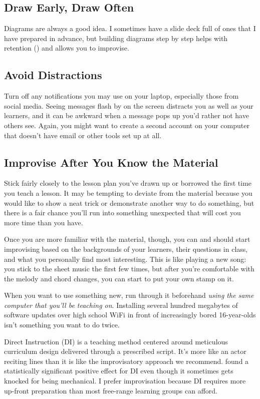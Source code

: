 \subsection*{Draw Early, Draw Often}

Diagrams are always a good idea.
I sometimes have a slide deck full of ones that I have prepared in advance,
but building diagrams step by step helps with retention ()
and allows you to improvise.

\subsection*{Avoid Distractions}

Turn off any notifications you may use on your laptop,
especially those from social media.
Seeing messages flash by on the screen distracts you as well as your learners,
and it can be awkward when a message pops up you'd rather not have others see.
Again,
you might want to create a second account on your computer
that doesn't have email or other tools set up at all.

\subsection*{Improvise After You Know the Material}

Stick fairly closely to the lesson plan you've drawn up or borrowed
the first time you teach a lesson.
It may be tempting to deviate from the material
because you would like to show a neat trick or demonstrate another way to do something,
but there is a fair chance you'll run into something unexpected
that will cost you more time than you have.

Once you are more familiar with the material,
though,
you can and should start improvising based on the backgrounds of your learners,
their questions in class,
and what you personally find most interesting.
This is like playing a new song:
you stick to the sheet music the first few times,
but after you're comfortable with the melody and chord changes,
you can start to put your own stamp on it.

When you want to use something new,
run through it beforehand
\emph{using the same computer that you'll be teaching on}.
Installing several hundred megabytes of software updates over high school WiFi
in front of increasingly bored 16-year-olds isn't something you want to do twice.

\begin{aside}{Direct Instruction}
   (DI) is a teaching method
  centered around meticulous curriculum design delivered through a prescribed script.
  It's more like an actor reciting lines than it is like the improvisatory approach we recommend.
  \cite{Stoc2018} found a statistically significant positive effect for DI
  even though it sometimes gets knocked for being mechanical.
  I prefer improvisation because DI requires more up-front preparation
  than most free-range learning groups can afford.
\end{aside}

